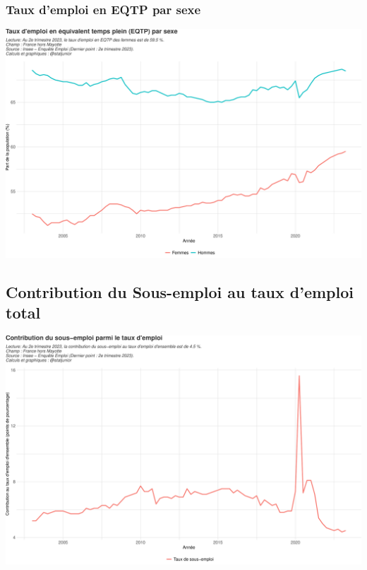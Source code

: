 \documentclass[
  paper=a4,
  ,captions=tableheading
]{scrartcl}
\begin{document}
\hypertarget{taux-demploi-en-eqtp-par-sexe}{%
\subsubsection{Taux d'emploi en EQTP par
sexe}\label{taux-demploi-en-eqtp-par-sexe}}

\includegraphics{rapport_activite_emploi_chomage_insee_files/figure-latex/unnamed-chunk-11-1.pdf}

\hypertarget{contribution-du-sous-emploi-au-taux-demploi-total}{%
\subsection{Contribution du Sous-emploi au taux d'emploi
total}\label{contribution-du-sous-emploi-au-taux-demploi-total}}

\includegraphics{rapport_activite_emploi_chomage_insee_files/figure-latex/unnamed-chunk-12-1.pdf}
\end{document}
